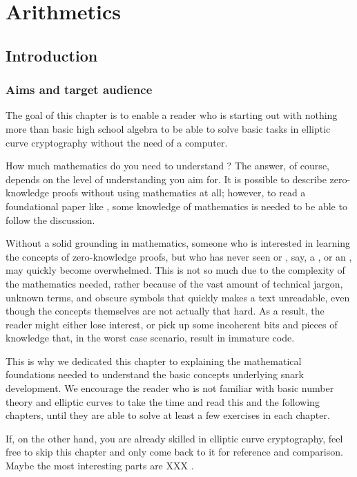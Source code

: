 \chapter{Arithmetics}\label{chap:arithmetics}

\section{Introduction}

\subsection{Aims and target audience}

The goal of this chapter is to enable a reader who is starting out with nothing more than basic high school algebra to be able to solve basic tasks in elliptic curve cryptography without the need of a computer.

How much mathematics do you need to understand ? The answer, of course, depends on the level of understanding you aim for. It is possible to describe zero-knowledge proofs without using mathematics at all; however, to read a foundational paper like \cite{Groth16}, some knowledge of mathematics is needed to be able to follow the discussion. 

Without a solid grounding in mathematics, someone who is interested in learning the concepts of zero-knowledge proofs, but who
has never seen or , say, a , or an , may quickly become overwhelmed. This is not so much due to the complexity of the mathematics needed, rather because of the vast amount of technical jargon, unknown terms, and obscure symbols that quickly makes a text unreadable, even though the concepts themselves are not actually that hard. As a result, the reader might either lose interest, or pick up some incoherent bits and pieces of knowledge that, in the worst case scenario, result in immature code. 

This is why we dedicated this chapter to explaining the mathematical foundations needed to understand the basic concepts underlying snark development. We encourage the reader who is not familiar with basic number theory and elliptic curves to take the time and read this and the following chapters, until they are able to solve at least a few exercises in each chapter.

If, on the other hand, you are already skilled in elliptic curve cryptography, feel free to skip this chapter and only come back to it for reference and comparison. Maybe the most interesting parts are XXX .

